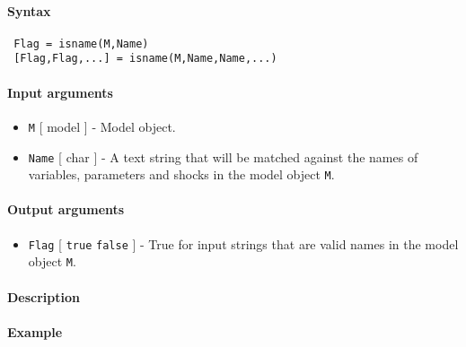


	\paragraph{Syntax}
 
 \begin{verbatim}
 Flag = isname(M,Name)
 [Flag,Flag,...] = isname(M,Name,Name,...)
 \end{verbatim}
 
 \paragraph{Input arguments}
 
 \begin{itemize}
 \item
   \texttt{M} {[} model {]} - Model object.
 \item
   \texttt{Name} {[} char {]} - A text string that will be matched
   against the names of variables, parameters and shocks in the model
   object \texttt{M}.
 \end{itemize}
 
 \paragraph{Output arguments}
 
 \begin{itemize}
 \item
   \texttt{Flag} {[} \texttt{true} \textbar{} \texttt{false} {]} - True
   for input strings that are valid names in the model object \texttt{M}.
 \end{itemize}
 
 \paragraph{Description}
 
 \paragraph{Example}


